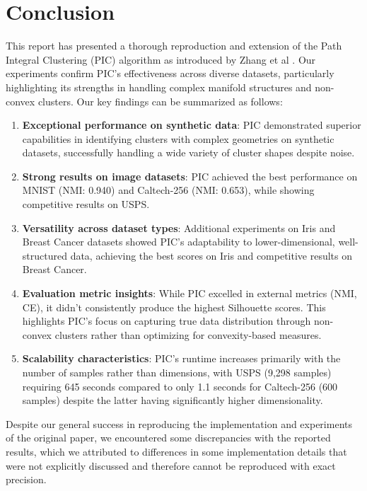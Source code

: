 \section{Conclusion}

This report has presented a thorough reproduction and extension of the Path Integral Clustering (PIC) algorithm as introduced by Zhang et al \cite{PIC}. Our experiments confirm PIC's effectiveness across diverse datasets, particularly highlighting its strengths in handling complex manifold structures and non-convex clusters. Our key findings can be summarized as follows:

\begin{enumerate}
    \item \textbf{Exceptional performance on synthetic data}: PIC demonstrated superior capabilities in identifying clusters with complex geometries on synthetic datasets, successfully handling a wide variety of cluster shapes despite noise.

    \item \textbf{Strong results on image datasets}: PIC achieved the best performance on MNIST (NMI: 0.940) and Caltech-256 (NMI: 0.653), while showing competitive results on USPS.

    \item \textbf{Versatility across dataset types}: Additional experiments on Iris and Breast Cancer datasets showed PIC's adaptability to lower-dimensional, well-structured data, achieving the best scores on Iris and competitive results on Breast Cancer.

    \item \textbf{Evaluation metric insights}: While PIC excelled in external metrics (NMI, CE), it didn't consistently produce the highest Silhouette scores. This highlights PIC's focus on capturing true data distribution through non-convex clusters rather than optimizing for convexity-based measures.

    \item \textbf{Scalability characteristics}: PIC's runtime increases primarily with the number of samples rather than dimensions, with USPS (9,298 samples) requiring 645 seconds compared to only 1.1 seconds for Caltech-256 (600 samples) despite the latter having significantly higher dimensionality.
\end{enumerate}

Despite our general success in reproducing the implementation and experiments of the original paper, we encountered some discrepancies with the reported results, which we attributed to differences in some implementation details that were not explicitly discussed and therefore cannot be reproduced with exact precision.

